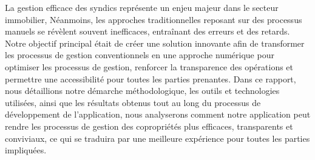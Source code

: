 La gestion efficace des syndics représente un enjeu majeur dans le secteur immobilier, Néanmoins, les approches traditionnelles reposant sur des processus manuels se révèlent souvent inefficaces, entraînant des erreurs et des retards. Notre objectif principal était de créer une solution innovante afin de transformer les processus de gestion conventionnels en une approche numérique pour optimiser les processus de gestion, renforcer la transparence des opérations et permettre une accessibilité pour toutes les parties prenantes.
Dans ce rapport, nous détaillions notre démarche méthodologique, les outils et technologies utilisées, ainsi que les résultats obtenus tout au long du processus de développement de l'application, nous analyserons comment notre application peut rendre les processus de gestion des copropriétés plus efficaces, transparents et conviviaux, ce qui se traduira par une meilleure expérience pour toutes les parties impliquées.
